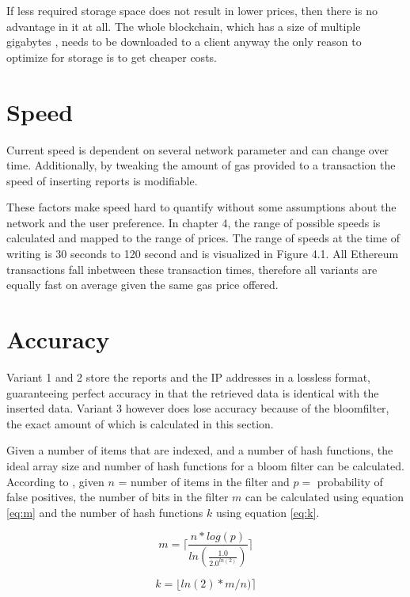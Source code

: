 If less required storage space does not result in lower prices, then there is no advantage in it at all. The whole blockchain, which has a size of multiple gigabytes \cite{EthereumBlockchainSize}, needs to be downloaded to a client anyway \textemdash {} the only reason to optimize for storage is to get cheaper costs.

\section{Speed}

Current speed is dependent on several network parameter and can change over time. Additionally, by tweaking the amount of gas provided to a transaction the speed of inserting reports is modifiable.

These factors make speed hard to quantify without some  assumptions about the network and the user preference. In chapter 4, the range of possible speeds is calculated and mapped to the range of prices. The range of speeds at the time of writing is 30 seconds to 120 second and is visualized in Figure 4.1. All Ethereum transactions fall inbetween these transaction times, therefore all variants are equally fast on average given the same gas price offered.

\section{Accuracy}

Variant 1 and 2 store the reports and the IP addresses in a lossless format, guaranteeing perfect accuracy in that the retrieved data is identical with the inserted data. Variant 3 however does lose accuracy because of the bloomfilter, the exact amount of which is calculated in this section.

Given a number of items that are indexed, and a number of hash functions, the ideal array size and number of hash functions for a bloom filter can be calculated. According to \cite{BloomfilterAccuracy}, given $n$ = number of items in the filter and $p =$ probability of false positives, the number of bits in the filter $m$ can be calculated using equation \ref{eq:m} and the number of hash functions $k$ using equation \ref{eq:k}. 

\begin{equation}
m = \lceil\frac{n * log(p)}{ln(\frac{1.0}{2.0 ^{ln(2)}})}\rceil
\label{eq:m}
\end{equation}

\begin{equation}
k = \lfloor ln(2) * m / n) \rceil
\label{eq:k}
\end{equation}

